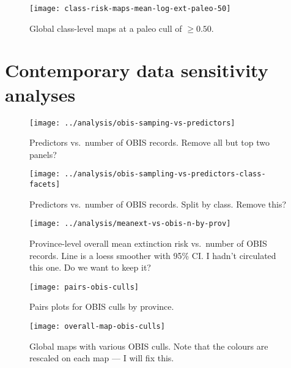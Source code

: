 \documentclass[11pt]{article}
\begin{document}
\begin{figure}[htbp]
\begin{center}
\texttt{[image: class-risk-maps-mean-log-ext-paleo-50]}
\caption{Global class-level maps at a paleo cull of $\ge 0.50$.}
\label{fig:class-maps-paleo-cull-0.50}
\end{center}
\end{figure}

\clearpage

\section{Contemporary data sensitivity analyses}

\begin{figure}[htbp]
\begin{center}
\texttt{[image: ../analysis/obis-samping-vs-predictors]}
\caption{Predictors vs.\ number of OBIS records. Remove all but top two panels?}
\label{fig:obis-sampling-vs-predictors}
\end{center}
\end{figure}

\clearpage

\begin{figure}[htbp]
\begin{center}
\texttt{[image: ../analysis/obis-sampling-vs-predictors-class-facets]}
\caption{Predictors vs.\ number of OBIS records. Split by class. Remove this?}
\label{fig:obis-sampling-vs-predictors-by-class}
\end{center}
\end{figure}

\clearpage

\begin{figure}[htbp]
\begin{center}
\texttt{[image: ../analysis/meanext-vs-obis-n-by-prov]}
\caption{Province-level overall mean extinction risk vs.\ number of OBIS records. Line is a loess smoother with 95\% CI. I hadn't circulated this one. Do we want to keep it?}
\label{fig:ext-vs-obis-n-by-prov}
\end{center}
\end{figure}

\clearpage

\begin{figure}[htbp]
\begin{center}
\texttt{[image: pairs-obis-culls]}
\caption{Pairs plots for OBIS culls by province.}
\label{fig:pairs-prov-obis-culls}
\end{center}
\end{figure}

\clearpage

\begin{figure}[htbp]
\begin{center}
\texttt{[image: overall-map-obis-culls]}
\caption{Global maps with various OBIS culls. Note that the colours are rescaled on each map --- I will fix this.}
\label{fig:overall-maps-obis-culls}
\end{center}
\end{figure}
\end{document}
